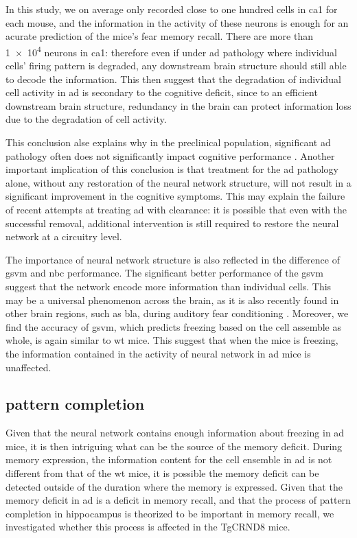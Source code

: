 In this study, we on average only recorded close to one hundred cells in \gls{ca1} for each mouse, and the information in the activity of these neurons is enough for an acurate prediction of the mice's fear memory recall. There are more than \num{1e4} neurons in \gls{ca1}: therefore even if under \gls{ad} pathology where individual cells' firing pattern is degraded, any downstream brain structure should still able to decode the information. This then suggest that the degradation of individual cell activity in \gls{ad} is secondary to the cognitive deficit, since to an efficient downstream brain structure, redundancy in the brain can protect information loss due to the degradation of cell activity. 

This conclusion alse explains why in the preclinical population, significant \gls{ad} pathology often does not significantly impact cognitive performance . Another important implication of this conclusion is that treatment for the \gls{ad} pathology alone, without any restoration of the neural network structure, will not result in a significant improvement in the cognitive symptoms. This may explain the failure of recent attempts at treating \gls{ad} with \abeta{} clearance: it is possible that even with the successful \abeta{} removal, additional intervention is still required to restore the neural network at a circuitry level.

The importance of neural network structure is also reflected in the difference of \gls{gsvm} and \gls{nbc} performance. The significant better performance of the \gls{gsvm} suggest that the network encode more information than individual cells. This may be a universal phenomenon across the brain, as it is also recently found in other brain regions, such as \gls{bla}, during auditory fear conditioning \citep{grewe17}. Moreover, we find the accuracy of \gls{gsvm}, which predicts freezing based on the cell assemble as whole, is again similar to \gls{wt} mice. This suggest that when the mice is freezing, the information contained in the activity of neural network in \gls{ad} mice is unaffected. 

\subsection{pattern completion}

Given that the neural network contains enough information about freezing in \gls{ad} mice, it is then intriguing what can be the source of the memory deficit. During memory expression, the information content for the cell ensemble in \gls{ad} is not different from that of the \gls{wt} mice, it is possible the memory deficit can be detected outside of the duration where the memory is expressed. Given that the memory deficit in \gls{ad} is a deficit in memory recall, and that the process of pattern completion in hippocampus is theorized to be important in memory recall, we investigated whether this process is affected in the TgCRND8 mice.

